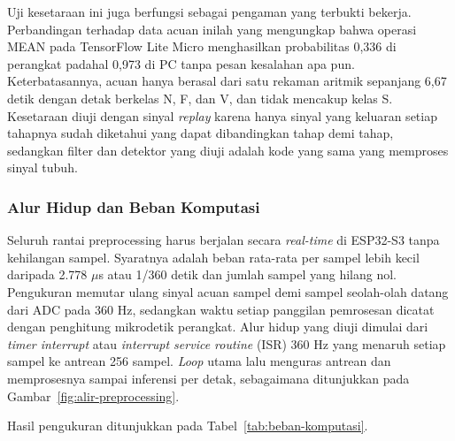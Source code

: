 Uji kesetaraan ini juga berfungsi sebagai pengaman yang terbukti bekerja. Perbandingan terhadap data acuan inilah yang mengungkap bahwa operasi MEAN pada TensorFlow Lite Micro menghasilkan probabilitas 0,336 di perangkat padahal 0,973 di PC tanpa pesan kesalahan apa pun. Keterbatasannya, acuan hanya berasal dari satu rekaman aritmik sepanjang 6,67 detik dengan detak berkelas N, F, dan V, dan tidak mencakup kelas S. Kesetaraan diuji dengan sinyal \textit{replay} karena hanya sinyal yang keluaran setiap tahapnya sudah diketahui yang dapat dibandingkan tahap demi tahap, sedangkan filter dan detektor yang diuji adalah kode yang sama yang memproses sinyal tubuh.

\subsubsection{Alur Hidup dan Beban Komputasi}

Seluruh rantai preprocessing harus berjalan secara \textit{real-time} di ESP32-S3 tanpa kehilangan sampel. Syaratnya adalah beban rata-rata per sampel lebih kecil daripada 2.778 $\mu$s atau 1/360 detik dan jumlah sampel yang hilang nol. Pengukuran memutar ulang sinyal acuan sampel demi sampel seolah-olah datang dari ADC pada 360 Hz, sedangkan waktu setiap panggilan pemrosesan dicatat dengan penghitung mikrodetik perangkat. Alur hidup yang diuji dimulai dari \textit{timer interrupt} atau \textit{interrupt service routine} (ISR) 360 Hz yang menaruh setiap sampel ke antrean 256 sampel. \textit{Loop} utama lalu menguras antrean dan memprosesnya sampai inferensi per detak, sebagaimana ditunjukkan pada Gambar~\ref{fig:alir-preprocessing}.

Hasil pengukuran ditunjukkan pada Tabel~\ref{tab:beban-komputasi}.

